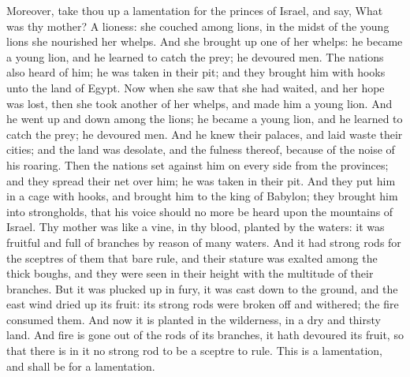 Moreover, take thou up a lamentation for the princes of Israel, and say, What was thy mother? A lioness: she couched among lions, in the midst of the young lions she nourished her whelps. And she brought up one of her whelps: he became a young lion, and he learned to catch the prey; he devoured men. The nations also heard of him; he was taken in their pit; and they brought him with hooks unto the land of Egypt. Now when she saw that she had waited, and her hope was lost, then she took another of her whelps, and made him a young lion. And he went up and down among the lions; he became a young lion, and he learned to catch the prey; he devoured men. And he knew their palaces, and laid waste their cities; and the land was desolate, and the fulness thereof, because of the noise of his roaring. Then the nations set against him on every side from the provinces; and they spread their net over him; he was taken in their pit. And they put him in a cage with hooks, and brought him to the king of Babylon; they brought him into strongholds, that his voice should no more be heard upon the mountains of Israel.  Thy mother was like a vine, in thy blood, planted by the waters: it was fruitful and full of branches by reason of many waters. And it had strong rods for the sceptres of them that bare rule, and their stature was exalted among the thick boughs, and they were seen in their height with the multitude of their branches. But it was plucked up in fury, it was cast down to the ground, and the east wind dried up its fruit: its strong rods were broken off and withered; the fire consumed them. And now it is planted in the wilderness, in a dry and thirsty land. And fire is gone out of the rods of its branches, it hath devoured its fruit, so that there is in it no strong rod to be a sceptre to rule. This is a lamentation, and shall be for a lamentation. 


